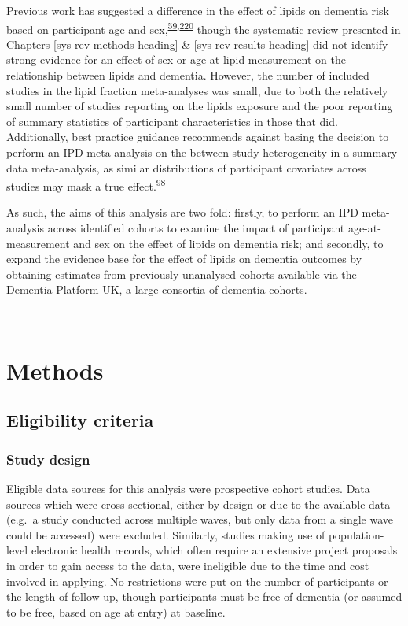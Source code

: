 \documentclass[a4paper, twoside]{templates/ociamthesis}
\begin{document}
Previous work has suggested a difference in the effect of lipids on dementia risk based on participant age and sex,\textsuperscript{\protect\hyperlink{ref-mielke2010}{59},\protect\hyperlink{ref-ancelin2013}{220}} though the systematic review presented in Chapters \ref{sys-rev-methods-heading} \& \ref{sys-rev-results-heading} did not identify strong evidence for an effect of sex or age at lipid measurement on the relationship between lipids and dementia. However, the number of included studies in the lipid fraction meta-analyses was small, due to both the relatively small number of studies reporting on the lipids exposure and the poor reporting of summary statistics of participant characteristics in those that did. Additionally, best practice guidance recommends against basing the decision to perform an IPD meta-analysis on the between-study heterogeneity in a summary data meta-analysis, as similar distributions of participant covariates across studies may mask a true effect.\textsuperscript{\protect\hyperlink{ref-riley2020}{98}}

As such, the aims of this analysis are two fold: firstly, to perform an IPD meta-analysis across identified cohorts to examine the impact of participant age-at-measurement and sex on the effect of lipids on dementia risk; and secondly, to expand the evidence base for the effect of lipids on dementia outcomes by obtaining estimates from previously unanalysed cohorts available via the Dementia Platform UK, a large consortia of dementia cohorts.

~

\hypertarget{methods-2}{%
\section{Methods}\label{methods-2}}

\hypertarget{eligibility-criteria-1}{%
\subsection{Eligibility criteria}\label{eligibility-criteria-1}}

\hypertarget{study-design}{%
\subsubsection{Study design}\label{study-design}}

Eligible data sources for this analysis were prospective cohort studies. Data sources which were cross-sectional, either by design or due to the available data (e.g.~a study conducted across multiple waves, but only data from a single wave could be accessed) were excluded. Similarly, studies making use of population-level electronic health records, which often require an extensive project proposals in order to gain access to the data, were ineligible due to the time and cost involved in applying. No restrictions were put on the number of participants or the length of follow-up, though participants must be free of dementia (or assumed to be free, based on age at entry) at baseline.
\end{document}

